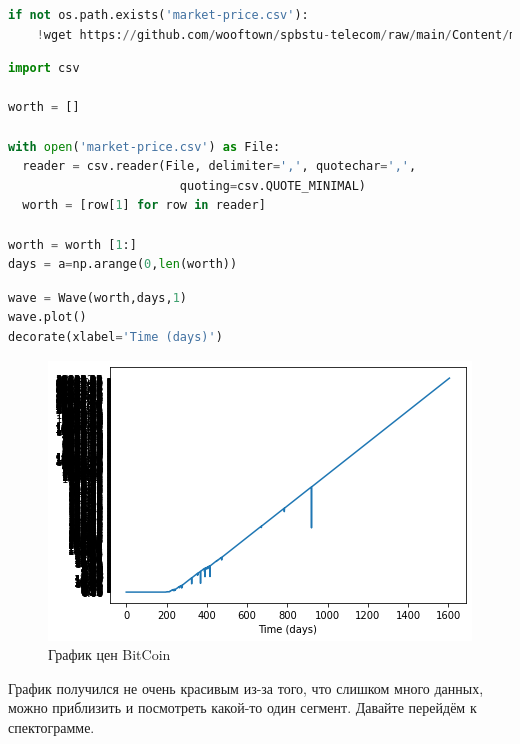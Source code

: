 \begin{lstlisting}[language=Python]
  if not os.path.exists('market-price.csv'):
    !wget https://github.com/wooftown/spbstu-telecom/raw/main/Content/market-price.csv
\end{lstlisting}
\begin{lstlisting}[language=Python]
import csv

worth = []

with open('market-price.csv') as File:
  reader = csv.reader(File, delimiter=',', quotechar=',',
                        quoting=csv.QUOTE_MINIMAL)
  worth = [row[1] for row in reader]

worth = worth [1:]
days = a=np.arange(0,len(worth))
\end{lstlisting}
\begin{lstlisting}[language=Python]
wave = Wave(worth,days,1)
wave.plot()
decorate(xlabel='Time (days)')
\end{lstlisting}
\begin{figure}[H]
	\begin{center}
		\includegraphics[scale=1]{fig/lab04/lab04_28_0.png}
		\caption{График цен BitCoin}
	\end{center}
\end{figure}

График получился не очень красивым из-за того, что слишком много данных, можно приблизить и посмотреть какой-то один сегмент. Давайте перейдём к спектограмме.

